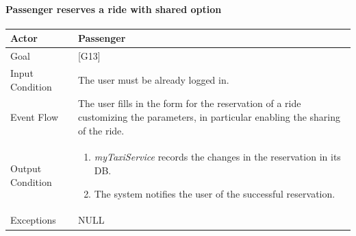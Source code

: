 \documentclass[a4paper,11pt]{report} %
\newcommand{\mts}{\mbox{\normalfont\itshape myTaxiService}}
\begin{document}
	\pagebreak
	
	\paragraph{Passenger reserves a ride with shared option}
	\begin{center}
		\begin{tabular}{| l | p{9cm} |}\hline
			Actor & Passenger\\\hline
			Goal & {[}G13{]} \\\hline
			Input Condition & The user must be already logged in.\\\hline
			Event Flow & The user fills in the form for the reservation of a ride customizing the parameters, in particular enabling the sharing of the ride.\\\hline
			Output Condition & \begin{enumerate}
				\item \mts{} records the changes in the reservation in its DB.
				\item The system notifies the user of the successful reservation.
			\end{enumerate}\\\hline
			Exceptions & NULL\\\hline
		\end{tabular}
	\end{center}	
	
%	
	
\end{document}
